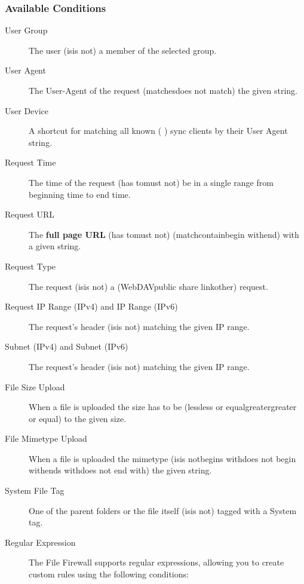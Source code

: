 \documentclass[letterpaper,10pt,english]{sphinxmanual}
\begin{document}
\subsubsection{Available Conditions}
\label{enterprise_firewall/file_firewall:available-conditions}\begin{description}
\item[{User Group}] \leavevmode
The user (is\textbar{}is not) a member of the selected group.

\item[{User Agent}] \leavevmode
The User-Agent of the request (matches\textbar{}does not match) the given string.

\item[{User Device}] \leavevmode
A shortcut for matching all known ( \textbar{}  \textbar{} ) sync clients by
their User Agent string.

\item[{Request Time}] \leavevmode
The time of the request (has to\textbar{}must not) be in a single range from beginning
time to end time.

\item[{Request URL}] \leavevmode
The \textbf{full page URL} (has to\textbar{}must not) (match\textbar{}contain\textbar{}begin with\textbar{}end) with a
given string.

\item[{Request Type}] \leavevmode
The request (is\textbar{}is not) a (WebDAV\textbar{}public share link\textbar{}other) request.

\item[{Request IP Range (IPv4) and IP Range (IPv6)}] \leavevmode
The request's  header (is\textbar{}is not) matching the given IP range.

\item[{Subnet (IPv4) and Subnet (IPv6)}] \leavevmode
The request's  header (is\textbar{}is not) matching the given IP range.

\item[{File Size Upload}] \leavevmode
When a file is uploaded the size has to be (less\textbar{}less or equal\textbar{}greater\textbar{}greater
or equal) to the given size.

\item[{File Mimetype Upload}] \leavevmode
When a file is uploaded the mimetype (is\textbar{}is not\textbar{}begins with\textbar{}does not begin
with\textbar{}ends with\textbar{}does not end with) the given string.

\item[{System File Tag}] \leavevmode
One of the parent folders or the file itself (is\textbar{}is not) tagged with a System
tag.

\item[{Regular Expression}] \leavevmode
The File Firewall supports regular expressions, allowing you to create custom
rules using the following conditions:

\end{description}
\end{document}
